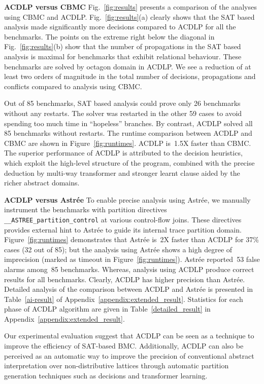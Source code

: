 

%
\noindent \textbf{ACDLP versus CBMC}
Fig.~\ref{fig:results} presents a comparison of the analyses using CBMC
and ACDLP.  Fig.~\ref{fig:results}(a) clearly shows that the SAT based analysis 
made significantly more decisions compared to ACDLP for all the benchmarks. 
The points on the extreme right below the diagonal in
Fig.~\ref{fig:results}(b) show that the number of propagations in the SAT based 
analysis is maximal for benchmarks that exhibit relational behaviour.  These
benchmarks are solved by octagon domain in ACDLP.  We see a reduction of at 
least two orders of magnitude in the total number of decisions, propagations 
and conflicts compared to analysis using CBMC.  

Out of 85 benchmarks, SAT based analysis could prove only 26
benchmarks without any restarts.  The solver was restarted in the other 59 
cases to avoid spending too much time in ``hopeless'' branches.  By contrast, 
ACDLP solved all 85 benchmarks without restarts.  
The runtime comparison between ACDLP and CBMC are shown in 
Figure~\ref{fig:runtimes}.  ACDLP is~1.5X faster than CBMC. 
The superior performance of ACDLP is attributed to the decision heuristics, 
which exploit the high-level structure of the program, combined with the 
precise deduction by multi-way transformer and stronger learnt clause aided 
by the richer abstract domains. 
%


\noindent \textbf{ACDLP versus Astr{\'e}e}
%
To enable precise analysis using Astr{\'e}e, we manually instrument 
the benchmarks with partition directives \texttt{\_\_ASTREE\_partition\_control} 
at various control-flow joins.  These directives provides external hint to
Astr{\'e}e to guide its internal trace partition domain. 
Figure~\ref{fig:runtimes} demonstrates that Astr{\'e}e is~2X faster 
than ACDLP for {37}\% cases (32 out of 85); but the analysis using 
Astr{\'e}e shows a high degree of imprecision (marked as timeout in 
Figure~\ref{fig:runtimes}).  Astr{\'e}e reported~53 false alarms 
among~85 benchmarks.  Whereas, analysis using ACDLP produce correct 
results for all benchmarks.  Clearly, ACDLP has higher precision than 
Astr{\'e}e. Detailed analysis of the comparison between ACDLP and 
Astr{\'e}e is presented in Table~\ref{ai-result} of 
Appendix~\ref{appendix:extended_result}.  Statistics for each phase of ACDLP 
algorithm are given in Table~\ref{detailed_result} in Appendix~\ref{appendix:extended_result}.  


Our experimental evaluation suggest that ACDLP can be seen as a
technique to improve the efficiency of SAT-based BMC.  Additionally, ACDLP can
also be perceived as an automatic way to improve the precision of conventional
abstract interpretation over non-distributive lattices through automatic partition 
generation techniques such as decisions and transformer learning.
